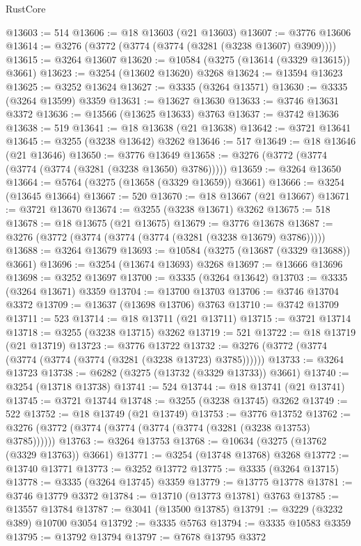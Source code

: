 \begin{lexlean}{RustCore}
\begin{coremodule}
@13603 := 514
@13606 := @18 @13603 (@21 @13603)
@13607 := @3776 @13606
@13614 := @3276 (@3772 (@3774 (@3774 (@3281 (@3238 @13607) @3909))))
@13615 := @3264 @13607
@13620 := @10584 (@3275 (@13614 (@3329 @13615)) @3661)
@13623 := @3254 (@13602 @13620) @3268
@13624 := @13594 @13623
@13625 := @3252 @13624
@13627 := @3335 (@3264 @13571)
@13630 := @3335 (@3264 @13599) @3359
@13631 := @13627 @13630
@13633 := @3746 @13631 @3372
@13636 := @13566 (@13625 @13633) @3763
@13637 := @3742 @13636
@13638 := 519
@13641 := @18 @13638 (@21 @13638)
@13642 := @3721 @13641
@13645 := @3255 (@3238 @13642) @3262
@13646 := 517
@13649 := @18 @13646 (@21 @13646)
@13650 := @3776 @13649
@13658 := @3276 (@3772 (@3774 (@3774 (@3774 (@3281 (@3238 @13650) @3786)))))
@13659 := @3264 @13650
@13664 := @5764 (@3275 (@13658 (@3329 @13659)) @3661)
@13666 := @3254 (@13645 @13664)
@13667 := 520
@13670 := @18 @13667 (@21 @13667)
@13671 := @3721 @13670
@13674 := @3255 (@3238 @13671) @3262
@13675 := 518
@13678 := @18 @13675 (@21 @13675)
@13679 := @3776 @13678
@13687 := @3276 (@3772 (@3774 (@3774 (@3774 (@3281 (@3238 @13679) @3786)))))
@13688 := @3264 @13679
@13693 := @10584 (@3275 (@13687 (@3329 @13688)) @3661)
@13696 := @3254 (@13674 @13693) @3268
@13697 := @13666 @13696
@13698 := @3252 @13697
@13700 := @3335 (@3264 @13642)
@13703 := @3335 (@3264 @13671) @3359
@13704 := @13700 @13703
@13706 := @3746 @13704 @3372
@13709 := @13637 (@13698 @13706) @3763
@13710 := @3742 @13709
@13711 := 523
@13714 := @18 @13711 (@21 @13711)
@13715 := @3721 @13714
@13718 := @3255 (@3238 @13715) @3262
@13719 := 521
@13722 := @18 @13719 (@21 @13719)
@13723 := @3776 @13722
@13732 := @3276 (@3772 (@3774 (@3774 (@3774 (@3774 (@3281 (@3238 @13723) @3785))))))
@13733 := @3264 @13723
@13738 := @6282 (@3275 (@13732 (@3329 @13733)) @3661)
@13740 := @3254 (@13718 @13738)
@13741 := 524
@13744 := @18 @13741 (@21 @13741)
@13745 := @3721 @13744
@13748 := @3255 (@3238 @13745) @3262
@13749 := 522
@13752 := @18 @13749 (@21 @13749)
@13753 := @3776 @13752
@13762 := @3276 (@3772 (@3774 (@3774 (@3774 (@3774 (@3281 (@3238 @13753) @3785))))))
@13763 := @3264 @13753
@13768 := @10634 (@3275 (@13762 (@3329 @13763)) @3661)
@13771 := @3254 (@13748 @13768) @3268
@13772 := @13740 @13771
@13773 := @3252 @13772
@13775 := @3335 (@3264 @13715)
@13778 := @3335 (@3264 @13745) @3359
@13779 := @13775 @13778
@13781 := @3746 @13779 @3372
@13784 := @13710 (@13773 @13781) @3763
@13785 := @13557 @13784
@13787 := @3041 (@13500 @13785)
@13791 := @3229 (@3232 @389) @10700 @3054
@13792 := @3335 @5763
@13794 := @3335 @10583 @3359
@13795 := @13792 @13794
@13797 := @7678 @13795 @3372

\end{coremodule}
\end{lexlean}
